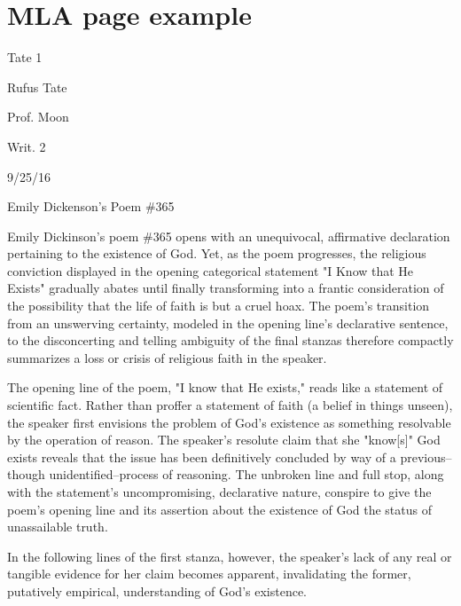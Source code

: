 \newpage
\section{MLA page example}

\bigskip

\begin{tcolorbox}[enhanced,width=4.2in,left=.3in, right=.3in,
   drop fuzzy shadow southeast,
    boxrule=0.4pt,sharp corners,colframe=black!80!black,colback=white!10]

\medskip

{\scriptsize \begin{flushright} Tate 1 \end{flushright}
\begin{doublespacing}
Rufus Tate

Prof. Moon

Writ. 2

9/25/16

\begin{center}Emily Dickenson's Poem \#365 \end{center}
\hspace{1.4em} Emily Dickinson's poem \#365 opens with an unequivocal, affirmative declaration pertaining to the existence of God.  Yet, as the poem progresses, the religious conviction displayed in the opening categorical statement "I Know that He Exists" gradually abates until finally transforming into a frantic consideration of the possibility that the life of faith is but a cruel hoax.  The poem's transition from an unswerving certainty, modeled in the opening line's declarative sentence, to the disconcerting and telling ambiguity of the final stanzas therefore compactly summarizes a loss or crisis of religious faith in the speaker.  
  
\hspace{1.4em} The opening line of the poem, "I know that He exists," reads like a statement of scientific fact.  Rather than proffer a statement of faith (a belief in things unseen), the speaker first envisions the problem of God's existence as something resolvable by the operation of reason.  The speaker's resolute claim that she "know[s]" God exists reveals that the issue has been definitively concluded by way of a previous--though unidentified--process of  reasoning.  The unbroken line and full stop, along with the statement's uncompromising, declarative nature, conspire to give the poem's opening line and its assertion about the existence of God the status of unassailable truth.  

\hspace{1.4em}In the following lines of the first stanza, however, the speaker's lack of any real or tangible evidence for her claim becomes apparent, invalidating the former, putatively empirical, understanding of God's existence.  

\end{doublespacing}}
\bigskip


\end{tcolorbox}

